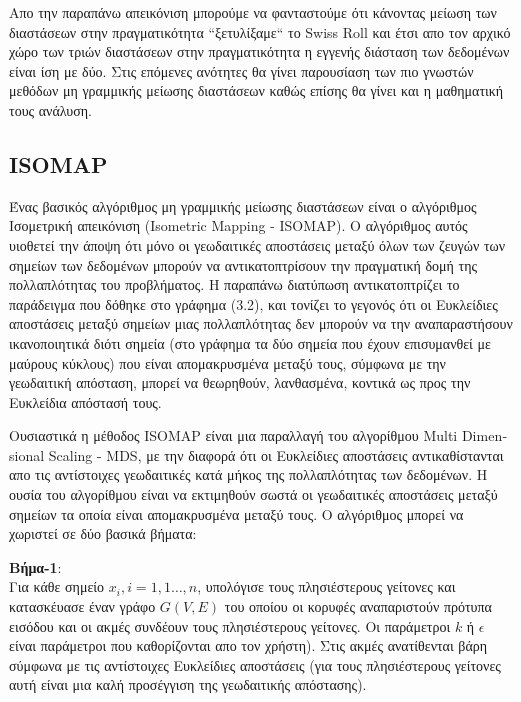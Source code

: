 \par
\vspace*{1cm}
Απο την παραπάνω απεικόνιση μπορούμε να φανταστούμε ότι κάνοντας μείωση των διαστάσεων στην πραγματικότητα ``ξετυλίξαμε`` το \textlatin{Swiss Roll} και έτσι απο τον αρχικό χώρο των τριών διαστάσεων στην πραγματικότητα η εγγενής διάσταση των δεδομένων είναι ίση με δύο. Στις επόμενες ανότητες θα γίνει παρουσίαση των πιο γνωστών μεθόδων μη γραμμικής μείωσης διαστάσεων καθώς επίσης θα γίνει και η μαθηματική τους ανάλυση.


\subsection{\textlatin{ISOMAP}}
\par
Ένας βασικός αλγόριθμος μη γραμμικής μείωσης διαστάσεων είναι ο αλγόριθμος Ισομετρική απεικόνιση \textlatin{(Isometric Mapping - ISOMAP)}. Ο αλγόριθμος αυτός υιοθετεί την άποψη ότι μόνο οι γεωδαιτικές αποστάσεις μεταξύ όλων των ζευγών των σημείων των δεδομένων μπορούν να αντικατοπτρίσουν την πραγματική δομή της πολλαπλότητας του προβλήματος. Η παραπάνω διατύπωση αντικατοπτρίζει το παράδειγμα που δόθηκε στο γράφημα (3.2), και τονίζει το γεγονός ότι οι Ευκλείδιες αποστάσεις μεταξύ σημείων μιας πολλαπλότητας δεν μπορούν να την αναπαραστήσουν ικανοποιητικά διότι σημεία (στο γράφημα τα δύο σημεία που έχουν επισυμανθεί με μαύρους κύκλους) που είναι απομακρυσμένα μεταξύ τους, σύμφωνα με την γεωδαιτική απόσταση, μπορεί να θεωρηθούν, λανθασμένα, κοντικά ως προς την Ευκλείδια απόστασή τους.
\par
Ουσιαστικά η μέθοδος \textlatin{ISOMAP} είναι μια παραλλαγή του αλγορίθμου \textlatin{Multi Dimensional Scaling - MDS}, με την διαφορά ότι οι Ευκλείδιες αποστάσεις αντικαθίστανται απο τις αντίστοιχες γεωδαιτικές κατά μήκος της πολλαπλότητας των δεδομένων. Η ουσία του αλγορίθμου είναι να εκτιμηθούν σωστά οι γεωδαιτικές αποστάσεις μεταξύ σημείων τα οποία είναι απομακρυσμένα μεταξύ τους. Ο αλγόριθμος μπορεί να χωριστεί σε δύο βασικά βήματα:
\par
\textbf{Βήμα-1}: \\ Για κάθε σημείο $x_{i},i=1,1\ldots,n$, υπολόγισε τους πλησιέστερους γείτονες και κατασκέυασε έναν γράφο $G(V,E)$ του οποίου οι κορυφές αναπαριστούν πρότυπα εισόδου και οι ακμές συνδέουν τους πλησιέστερους γείτονες. Οι παράμετροι $k$ ή $\epsilon$ είναι παράμετροι που καθορίζονται απο τον χρήστη). Στις ακμές ανατίθενται βάρη σύμφωνα με τις αντίστοιχες Ευκλείδιες αποστάσεις (για τους πλησιέστερους γείτονες αυτή είναι μια καλή προσέγγιση της γεωδαιτικής απόστασης).
